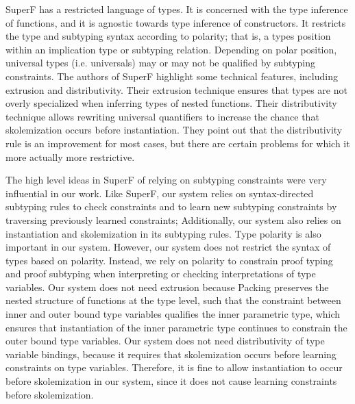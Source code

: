 \documentclass[table,dvipsnames,acmsmall]{acmart}
\theoremstyle{definition}
\begin{document}
SuperF has a restricted language of types. It is concerned with the type inference
of functions, and it is agnostic towards type inference of constructors. 
It restricts the type and subtyping syntax according to polarity; that is, a
types position within an implication type or subtyping relation. Depending on polar position,
universal types (i.e. universals) may or may not be qualified by subtyping constraints.
The authors of SuperF highlight some technical features, including extrusion and distributivity.
Their extrusion technique ensures that types are not overly specialized
when inferring types of nested functions. Their distributivity technique allows
rewriting universal quantifiers to increase the chance that skolemization occurs before instantiation. 
They point out that the distributivity rule is an improvement for most cases, but there are certain
problems for which it more actually more restrictive.


The high level ideas in SuperF of relying on subtyping constraints were very influential in our work.
Like SuperF, our system relies on syntax-directed subtyping rules to check constraints and to learn 
new subtyping constraints by traversing previously learned constraints;
Additionally, our system also relies on instantiation and skolemization in its subtyping rules. 
Type polarity is also important in our system.
However, our system does not restrict the syntax of types based on polarity. Instead, we rely on
polarity to constrain proof typing and proof subtyping when interpreting or checking interpretations
of type variables.    
Our system does not need extrusion because Packing  preserves the nested structure of 
functions at the type level, such that the constraint between inner and outer bound type variables
qualifies the inner parametric type, which ensures that instantiation of the inner parametric type 
continues to constrain the outer bound type variables.  
Our system does not need distributivity of type variable bindings, because it requires
that skolemization occurs before learning constraints on type variables. Therefore, it is fine to allow
instantiation to occur before skolemization in our system, 
since it does not cause learning constraints before skolemization.  



\end{document}
